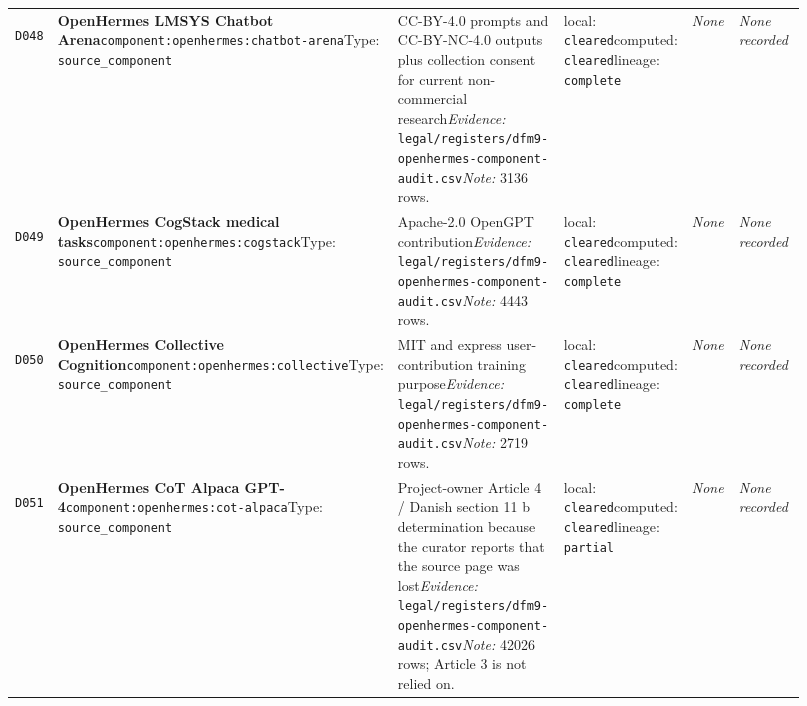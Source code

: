 \documentclass[9pt,a4paper]{article}
\newcommand{\depid}[1]{\hypertarget{dep:#1}{\texttt{#1}}}
\begin{document}
\begin{landscape}
\begin{longtable}{@{}L{0.035\linewidth}L{0.185\linewidth}L{0.27\linewidth}L{0.09\linewidth}L{0.10\linewidth}L{0.24\linewidth}@{}}
\depid{D048} & \textbf{OpenHermes LMSYS Chatbot Arena}\newline \nolinkurl{component:openhermes:chatbot-arena}\newline Type: \texttt{source\_component} & CC-BY-4.0 prompts and CC-BY-NC-4.0 outputs plus collection consent for current non-commercial research\newline \textit{Evidence:} \nolinkurl{legal/registers/dfm9-openhermes-component-audit.csv}\newline \textit{Note:} 3136 rows. & local: \texttt{cleared}\newline computed: \texttt{cleared}\newline lineage: \texttt{complete} & \textit{None} & \textit{None recorded} \\
\depid{D049} & \textbf{OpenHermes CogStack medical tasks}\newline \nolinkurl{component:openhermes:cogstack}\newline Type: \texttt{source\_component} & Apache-2.0 OpenGPT contribution\newline \textit{Evidence:} \nolinkurl{legal/registers/dfm9-openhermes-component-audit.csv}\newline \textit{Note:} 4443 rows. & local: \texttt{cleared}\newline computed: \texttt{cleared}\newline lineage: \texttt{complete} & \textit{None} & \textit{None recorded} \\
\depid{D050} & \textbf{OpenHermes Collective Cognition}\newline \nolinkurl{component:openhermes:collective}\newline Type: \texttt{source\_component} & MIT and express user-contribution training purpose\newline \textit{Evidence:} \nolinkurl{legal/registers/dfm9-openhermes-component-audit.csv}\newline \textit{Note:} 2719 rows. & local: \texttt{cleared}\newline computed: \texttt{cleared}\newline lineage: \texttt{complete} & \textit{None} & \textit{None recorded} \\
\depid{D051} & \textbf{OpenHermes CoT Alpaca GPT-4}\newline \nolinkurl{component:openhermes:cot-alpaca}\newline Type: \texttt{source\_component} & Project-owner Article 4 / Danish section 11 b determination because the curator reports that the source page was lost\newline \textit{Evidence:} \nolinkurl{legal/registers/dfm9-openhermes-component-audit.csv}\newline \textit{Note:} 42026 rows; Article 3 is not relied on. & local: \texttt{cleared}\newline computed: \texttt{cleared}\newline lineage: \texttt{partial} & \textit{None} & \textit{None recorded} \\

\end{longtable}
\end{landscape}
\end{document}
